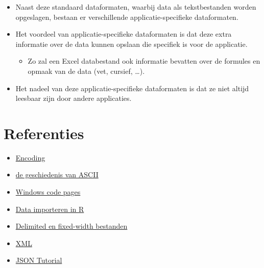 \documentclass[]{memoir}
\providecommand{\tightlist}{%
  \setlength{\itemsep}{0pt}\setlength{\parskip}{0pt}}
\begin{document}
\begin{itemize}
\tightlist
\item
  Naast deze standaard dataformaten, waarbij data als tekstbestanden worden opgeslagen, bestaan er verschillende applicatie-specifieke dataformaten.
\item
  Het voordeel van applicatie-specifieke dataformaten is dat deze extra informatie over de data kunnen opslaan die specifiek is voor de applicatie.

  \begin{itemize}
  \tightlist
  \item
    Zo zal een Excel databestand ook informatie bevatten over de formules en opmaak van de data (vet, cursief, \ldots{}).
  \end{itemize}
\item
  Het nadeel van deze applicatie-specifieke dataformaten is dat ze niet altijd leesbaar zijn door andere applicaties.
\end{itemize}

\hypertarget{referenties-6}{%
\section{Referenties}\label{referenties-6}}

\begin{itemize}
\tightlist
\item
  \href{http://kunststube.net/encoding/}{Encoding}
\item
  \href{https://www.joelonsoftware.com/2003/10/08/the-absolute-minimum-every-software-developer-absolutely-positively-must-know-about-unicode-and-character-sets-no-excuses/}{de geschiedenis van ASCII}
\item
  \href{https://en.wikipedia.org/wiki/Windows_code_page}{Windows code pages}
\item
  \href{http://r4ds.had.co.nz/data-import.html}{Data importeren in R}
\item
  \href{https://www.techwalla.com/articles/what-is-a-delimited-a-fixed-width-file}{Delimited en fixed-width bestanden}
\item
  \href{https://www.w3schools.com/xml/default.asp}{XML}
\item
  \href{http://beginnersbook.com/2015/04/json-tutorial/}{JSON Tutorial}
\end{itemize}
\end{document}
